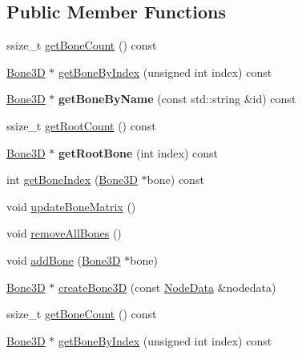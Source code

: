 \subsection*{Public Member Functions}
\begin{DoxyCompactItemize}
\item 
ssize\+\_\+t \hyperlink{classSkeleton3D_a20368b5e8e09e2f0d53ba7e27e40909d}{get\+Bone\+Count} () const
\item 
\hyperlink{classBone3D}{Bone3D} $\ast$ \hyperlink{classSkeleton3D_a336bc5a9523bb802d0e4369216757612}{get\+Bone\+By\+Index} (unsigned int index) const
\item 
\mbox{\label{classSkeleton3D_a2e6c483ce4b70490b9e973256b699408}} 
\hyperlink{classBone3D}{Bone3D} $\ast$ {\bfseries get\+Bone\+By\+Name} (const std\+::string \&id) const
\item 
ssize\+\_\+t \hyperlink{classSkeleton3D_affbb06a719abb420aa4ca170a153d3ab}{get\+Root\+Count} () const
\item 
\mbox{\label{classSkeleton3D_ad4b75d0fcd9b7643403fd66cad247724}} 
\hyperlink{classBone3D}{Bone3D} $\ast$ {\bfseries get\+Root\+Bone} (int index) const
\item 
int \hyperlink{classSkeleton3D_a0496264966b5aa0b32bb769f3d2db8e9}{get\+Bone\+Index} (\hyperlink{classBone3D}{Bone3D} $\ast$bone) const
\item 
void \hyperlink{classSkeleton3D_aaf4bd03372f7be1293cc4d62406127a2}{update\+Bone\+Matrix} ()
\item 
void \hyperlink{classSkeleton3D_aff81f1622948dcffb60ee17c022f425e}{remove\+All\+Bones} ()
\item 
void \hyperlink{classSkeleton3D_a73a1f94a7e99d7a06c4a078203a6f793}{add\+Bone} (\hyperlink{classBone3D}{Bone3D} $\ast$bone)
\item 
\hyperlink{classBone3D}{Bone3D} $\ast$ \hyperlink{classSkeleton3D_a478970d2b905bd5ea08e6cb175845573}{create\+Bone3D} (const \hyperlink{structNodeData}{Node\+Data} \&nodedata)
\item 
ssize\+\_\+t \hyperlink{classSkeleton3D_a20368b5e8e09e2f0d53ba7e27e40909d}{get\+Bone\+Count} () const
\item 
\hyperlink{classBone3D}{Bone3D} $\ast$ \hyperlink{classSkeleton3D_ada0124e128ce586b1e13d8a0ccbb44d5}{get\+Bone\+By\+Index} (unsigned int index) const
\item 
\mbox{\label{classSkeleton3D_a1d44b2f927f43cd8acb6c023aceb0884}} 

\end{DoxyCompactItemize}
